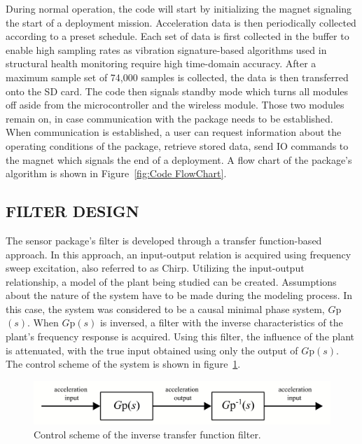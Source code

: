 \documentclass[]{spie}  %
\begin{document}
	During normal operation, the code will start by initializing the magnet signaling the start of a deployment mission. Acceleration data is then periodically collected according to a preset schedule. Each set of data is first collected in the buffer to enable high sampling rates as vibration signature-based algorithms used in structural health monitoring require high time-domain accuracy. After a maximum sample set of 74,000 samples is collected, the data is then transferred onto the SD card. The code then signals standby mode which turns all modules off aside from the microcontroller and the wireless module. Those two modules remain on, in case communication with the package needs to be established. When communication is established, a user can request information about the operating conditions of the package, retrieve stored data, send IO commands to the magnet which signals the end of a deployment. A flow chart of the package’s algorithm is shown in Figure~\ref{fig:Code FlowChart}.
	
	\subsection{FILTER DESIGN}


	The sensor package's filter is developed through a transfer function-based approach. In this approach, an input-output relation is acquired using frequency sweep excitation, also referred to as Chirp. Utilizing the input-output relationship, a model of the plant being studied can be created. Assumptions about the nature of the system have to be made during the modeling process. In this case, the system was considered to be a causal minimal phase system, $G$p$(s)$. When $G$p$(s)$ is inversed, a filter with the inverse characteristics of the plant’s frequency response is acquired. Using this filter, the influence of the plant is attenuated, with the true input obtained using only the output of $G$p$(s)$. The control scheme of the system is shown in figure~\ref{fig:Control_Scheme}.
	
	\begin{figure} [H]
		\centering
		\includegraphics[width=6 in]{figures/Control Scheme.png}
		\caption{Control scheme of the inverse transfer function filter.}
		\label{fig:Control_Scheme}
	\end{figure} 
\end{document}
